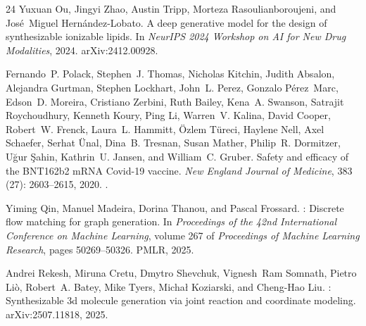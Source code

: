 \documentclass{article}
\begin{document}
\begin{thebibliography}{24}
Yuxuan Ou, Jingyi Zhao, Austin Tripp, Morteza Rasoulianboroujeni, and
  Jos\'{e}~Miguel Hern\'{a}ndez-Lobato.
\newblock A deep generative model for the design of synthesizable ionizable
  lipids.
\newblock In \emph{{NeurIPS} 2024 Workshop on {AI} for New Drug Modalities},
  2024.
\newblock arXiv:2412.00928.

Fernando~P. Polack, Stephen~J. Thomas, Nicholas Kitchin, Judith Absalon,
  Alejandra Gurtman, Stephen Lockhart, John~L. Perez, Gonzalo P\'{e}rez~Marc,
  Edson~D. Moreira, Cristiano Zerbini, Ruth Bailey, Kena~A. Swanson, Satrajit
  Roychoudhury, Kenneth Koury, Ping Li, Warren~V. Kalina, David Cooper,
  Robert~W. Frenck, Laura~L. Hammitt, \"{O}zlem T\"{u}reci, Haylene Nell, Axel
  Schaefer, Serhat \"{U}nal, Dina~B. Tresnan, Susan Mather, Philip~R.
  Dormitzer, U\u{g}ur \c{S}ahin, Kathrin~U. Jansen, and William~C. Gruber.
\newblock Safety and efficacy of the {BNT162b2} {mRNA} {Covid}-19 vaccine.
\newblock \emph{New England Journal of Medicine}, 383 (27):
  2603--2615, 2020.
\newblock {}.

Yiming Qin, Manuel Madeira, Dorina Thanou, and Pascal Frossard.
: Discrete flow matching for graph generation.
\newblock In \emph{Proceedings of the 42nd International Conference on Machine
  Learning}, volume 267 of \emph{Proceedings of Machine Learning Research},
  pages 50269--50326. PMLR, 2025.

Andrei Rekesh, Miruna Cretu, Dmytro Shevchuk, Vignesh~Ram Somnath, Pietro
  Li\`{o}, Robert~A. Batey, Mike Tyers, Micha{\l} Koziarski, and Cheng-Hao Liu.
: Synthesizable 3d molecule generation via joint reaction
  and coordinate modeling.
\newblock arXiv:2507.11818, 2025.


\end{thebibliography}
\end{document}
